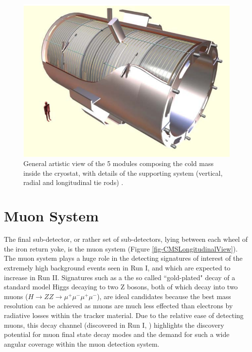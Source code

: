 \begin{figure} \label{fig-SuperconductingSolenoid}
\begin{center}
\includegraphics[scale=0.5]{Figures/SuperconductingSolenoid.png}
\caption{ General artistic view of the 5 modules composing the cold mass inside the cryostat, with details of the supporting system (vertical, radial and longitudinal tie rods) \cite{CMSexperiment}.}
\end{center}
\end{figure}


\section{Muon System} \label{sec-MuonSystem}

The final sub-detector, or rather set of sub-detectors, lying between each wheel of the iron return yoke, is the muon system (Figure \ref{fig-CMSLongitudinalView}). The muon system plays a huge role in the detecting signatures of interest of the extremely high background events seen in Run I, and which are expected to increase in Run II. Signatures such as a the so called ``gold-plated" decay of a standard model Higgs decaying to two Z bosons, both of which decay into two muons ($H \to ZZ \to \mu^+ \mu^- \mu^+ \mu^-$), are ideal candidates because the best mass resolution can be achieved as muons are much less effected than electrons by radiative losses within the tracker material. Due to the relative ease of detecting muons, this decay channel (discovered in Run I, \cite{}) highlights the discovery potential for muon final state decay modes and the demand for such a wide angular coverage within the muon detection system. 

